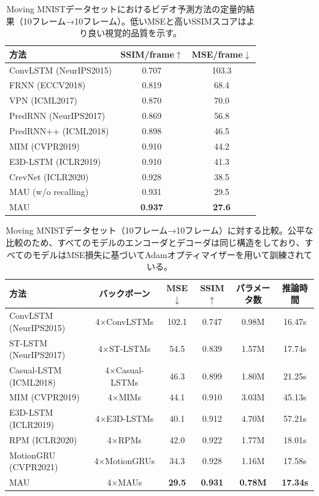         \begin{table}[h]
          \centering
          \caption{Moving MNISTデータセットにおけるビデオ予測方法の定量的結果（10フレーム→10フレーム）。低いMSEと高いSSIMスコアはより良い視覚的品質を示す。}
          \label{mau-mnist-1}
          \begin{tabular}{lcc}
          \hline
          \textbf{方法} & \textbf{SSIM/frame$\uparrow$} & \textbf{MSE/frame$\downarrow$} \\ \hline
          ConvLSTM (NeurIPS2015) & 0.707 & 103.3 \\
          FRNN (ECCV2018)  & 0.819 & 68.4 \\
          VPN (ICML2017) & 0.870 & 70.0 \\
          PredRNN (NeurIPS2017) & 0.869 & 56.8 \\
          PredRNN++ (ICML2018) & 0.898 & 46.5 \\
          MIM (CVPR2019) & 0.910 & 44.2 \\
          E3D-LSTM (ICLR2019) & 0.910 & 41.3 \\
          CrevNet (ICLR2020) & 0.928 & 38.5 \\
          MAU (w/o recalling) & 0.931 & 29.5 \\
          MAU & \textbf{0.937} & \textbf{27.6} \\ \hline
          \end{tabular}
        \end{table}
          
        \begin{table}[h]
          \centering
          \caption{Moving MNISTデータセット（10フレーム→10フレーム）に対する比較。公平な比較のため、すべてのモデルのエンコーダとデコーダは同じ構造をしており、すべてのモデルはMSE損失に基づいてAdamオプティマイザーを用いて訓練されている。}
          \label{mau-mnist-2}
          \begin{tabular}{lccccc}
          \hline
          \textbf{方法}            & \textbf{バックボーン} & \textbf{MSE$\downarrow$} & \textbf{SSIM$\uparrow$} & \textbf{パラメータ数} & \textbf{推論時間} \\ \hline
          ConvLSTM (NeurIPS2015) & 4×ConvLSTMs   & 102.1  & 0.747  & 0.98M   & 16.47s \\
          ST-LSTM (NeurIPS2017)  & 4×ST-LSTMs    & 54.5   & 0.839  & 1.57M   & 17.74s \\
          Casual-LSTM (ICML2018) & 4×Casual-LSTMs & 46.3   & 0.899  & 1.80M   & 21.25s \\
          MIM (CVPR2019)     & 4×MIMs        & 44.1   & 0.910  & 3.03M   & 45.13s \\
          E3D-LSTM (ICLR2019) & 4×E3D-LSTMs   & 40.1   & 0.912  & 4.70M   & 57.21s \\
          RPM (ICLR2020)     & 4×RPMs        & 42.0   & 0.922  & 1.77M   & 18.01s \\
          MotionGRU (CVPR2021)& 4×MotionGRUs  & 34.3   & 0.928  & 1.16M   & 17.58s \\
          MAU                         & 4×MAUs        & \textbf{29.5}   & \textbf{0.931}  & \textbf{0.78M}   & \textbf{17.34s} \\ \hline
          \end{tabular}
        \end{table}